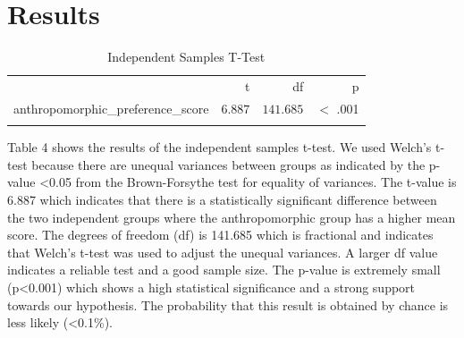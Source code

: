 \documentclass[conference]{IEEEtran}
\begin{document}
\section{Results}
\begin{table}[h]
	\centering
	\caption{Independent Samples T-Test}
	\label{tab:independentSamplesT-Test}
	{
		\begin{tabular}{lrrr}
			\toprule
			$ $ & t & df & p  \\
			\cmidrule[0.4pt]{1-4}
			anthropomorphic\_preference\_score & $6.887$ & $141.685$ & $<$ .001  \\
			\bottomrule
			\addlinespace[1ex]
			\multicolumn{4}{p{0.5\linewidth}}{\textit{Note.} Welch's t-test.} \\
		\end{tabular}
	}
\end{table}

Table 4 shows the results of the independent samples t-test. We used Welch’s t-test because there are unequal variances between groups as indicated by the p-value \textless 0.05 from the Brown-Forsythe test for equality of variances. The t-value is 6.887 which indicates that there is a statistically significant difference between the two independent groups where the anthropomorphic group has a higher mean score. The degrees of freedom (df) is 141.685 which is fractional and indicates that Welch’s t-test was used to adjust the unequal variances. A larger df value indicates a reliable test and a good sample size. The p-value is extremely small (p\textless0.001) which shows a high statistical significance and a strong support towards our hypothesis. The probability that this result is obtained by chance is less likely (\textless 0.1\%).                 


\begin{table}[h]
    \centering
    \caption{Independent Samples T-Test with Effect Size}
    \label{tab:independentSamplesT-TestCohensD}
\end{table}
\end{document}
